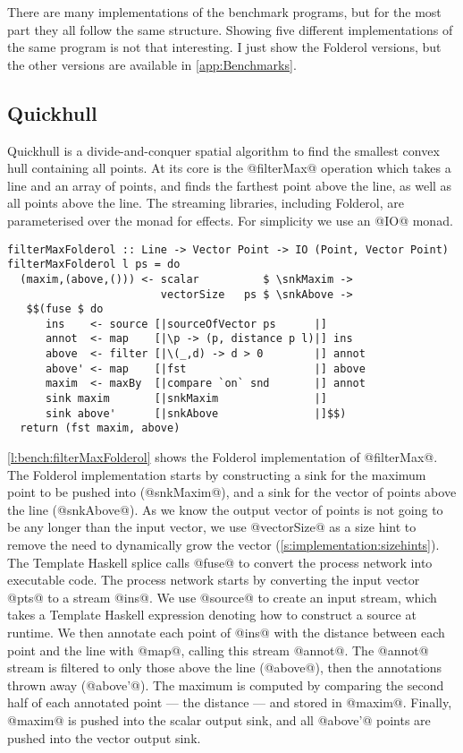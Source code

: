 There are many implementations of the benchmark programs, but for the most part they all follow the same structure.
Showing five different implementations of the same program is not that interesting.
I just show the Folderol versions, but the other versions are available in \autoref{app:Benchmarks}.

\subsection{Quickhull}

Quickhull is a divide-and-conquer spatial algorithm to find the smallest convex hull containing all points.
At its core is the @filterMax@ operation which takes a line and an array of points, and finds the farthest point above the line, as well as all points above the line.
The streaming libraries, including Folderol, are parameterised over the monad for effects. For simplicity we use an @IO@ monad.

\begin{lstlisting}[float,label=l:bench:filterMaxFolderol,caption=Folderol implementation of filterMax]
filterMaxFolderol :: Line -> Vector Point -> IO (Point, Vector Point)
filterMaxFolderol l ps = do
  (maxim,(above,())) <- scalar          $ \snkMaxim ->
                        vectorSize   ps $ \snkAbove ->
   $$(fuse $ do
      ins    <- source [|sourceOfVector ps      |]
      annot  <- map    [|\p -> (p, distance p l)|] ins
      above  <- filter [|\(_,d) -> d > 0        |] annot
      above' <- map    [|fst                    |] above
      maxim  <- maxBy  [|compare `on` snd       |] annot
      sink maxim       [|snkMaxim               |]
      sink above'      [|snkAbove               |]$$)
  return (fst maxim, above)
\end{lstlisting}

\autoref{l:bench:filterMaxFolderol} shows the Folderol implementation of @filterMax@.
The Folderol implementation starts by constructing a sink for the maximum point to be pushed into (@snkMaxim@), and a sink for the vector of points above the line (@snkAbove@).
As we know the output vector of points is not going to be any longer than the input vector, we use @vectorSize@ as a size hint to remove the need to dynamically grow the vector (\autoref{s:implementation:sizehints}).
The Template Haskell splice calls @fuse@ to convert the process network into executable code.
The process network starts by converting the input vector @pts@ to a stream @ins@.
We use @source@ to create an input stream, which takes a Template Haskell expression denoting how to construct a source at runtime.
We then annotate each point of @ins@ with the distance between each point and the line with @map@, calling this stream @annot@.
The @annot@ stream is filtered to only those above the line (@above@), then the annotations thrown away (@above'@).
The maximum is computed by comparing the second half of each annotated point --- the distance --- and stored in @maxim@.
Finally, @maxim@ is pushed into the scalar output sink, and all @above'@ points are pushed into the vector output sink.



